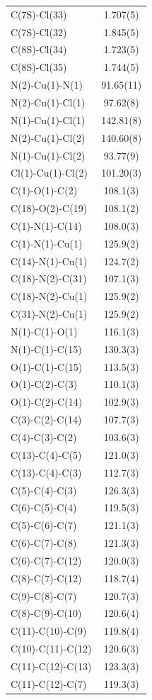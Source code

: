 \begin{center}
{\begin{supertabular}{p{1.5in}c}
C(7S)-Cl(33) &1.707(5)\\
C(7S)-Cl(32) &1.845(5)\\
C(8S)-Cl(34) &1.723(5)\\
C(8S)-Cl(35) &1.744(5)\\
N(2)-Cu(1)-N(1)&91.65(11)\\
N(2)-Cu(1)-Cl(1)&97.62(8)\\
N(1)-Cu(1)-Cl(1)&142.81(8)\\
N(2)-Cu(1)-Cl(2)&140.60(8)\\
N(1)-Cu(1)-Cl(2)&93.77(9)\\
Cl(1)-Cu(1)-Cl(2)&101.20(3)\\
C(1)-O(1)-C(2)&108.1(3)\\
C(18)-O(2)-C(19)&108.1(2)\\
C(1)-N(1)-C(14)&108.0(3)\\
C(1)-N(1)-Cu(1)&125.9(2)\\
C(14)-N(1)-Cu(1)&124.7(2)\\
C(18)-N(2)-C(31)&107.1(3)\\
C(18)-N(2)-Cu(1)&125.9(2)\\
C(31)-N(2)-Cu(1)&125.9(2)\\
N(1)-C(1)-O(1)&116.1(3)\\
N(1)-C(1)-C(15)&130.3(3)\\
O(1)-C(1)-C(15)&113.5(3)\\
O(1)-C(2)-C(3)&110.1(3)\\
O(1)-C(2)-C(14)&102.9(3)\\
C(3)-C(2)-C(14)&107.7(3)\\
C(4)-C(3)-C(2)&103.6(3)\\
C(13)-C(4)-C(5)&121.0(3)\\
C(13)-C(4)-C(3)&112.7(3)\\
C(5)-C(4)-C(3)&126.3(3)\\
C(6)-C(5)-C(4)&119.5(3)\\
C(5)-C(6)-C(7)&121.1(3)\\
C(6)-C(7)-C(8)&121.3(3)\\
C(6)-C(7)-C(12)&120.0(3)\\
C(8)-C(7)-C(12)&118.7(4)\\
C(9)-C(8)-C(7)&120.7(3)\\
C(8)-C(9)-C(10)&120.6(4)\\
C(11)-C(10)-C(9)&119.8(4)\\
C(10)-C(11)-C(12)&120.6(3)\\
C(11)-C(12)-C(13)&123.3(3)\\
C(11)-C(12)-C(7)&119.3(3)\\

\end{supertabular}}
\end{center}
